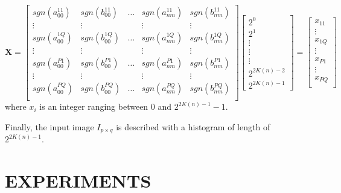 \documentclass[]{spie}  %
\begin{document}
\begin{equation}
\mathbf{X} = 
  \begin{bmatrix}
sgn(a_{00}^{11}) & sgn(b_{00}^{11}) & \hdots & sgn(a_{nm}^{11}) & sgn(b_{nm}^{11}) \\
  \vdots  & \vdots & & \vdots  & \vdots\\
sgn(a_{00}^{1Q}) & sgn(b_{00}^{1Q}) & \hdots & sgn(a_{nm}^{1Q}) & sgn(b_{nm}^{1Q}) \\
  \vdots  & \vdots & & \vdots  & \vdots\\
sgn(a_{00}^{P1}) & sgn(b_{00}^{P1}) & \hdots & sgn(a_{nm}^{P1}) & sgn(b_{nm}^{P1}) \\
  \vdots  & \vdots & & \vdots  & \vdots\\
sgn(a_{00}^{PQ}) &sgn(b_{00}^{PQ}) & \hdots & sgn(a_{nm}^{PQ}) & sgn(b_{nm}^{PQ}) \\
 \end{bmatrix}
 \begin{bmatrix}
2^0 \\
2^1 \\
 \vdots \\
  \vdots \\
   \vdots \\
 2^{2 K(n)-2} \\
 2^{2 K(n)-1}
 \end{bmatrix}=
 \begin{bmatrix}
 x_{11} \\
 \vdots \\
 x_{1Q} \\
  \vdots \\
 x_{P1} \\
  \vdots \\
 x_{PQ} \\
 \end{bmatrix}
 \label{eq:lzm_coded}
\end{equation}
where $x_{i}$ is an integer ranging between $0$ and $2^{2K(n)-1}-1$. 

Finally, the input image $I_{p\times q}$ is described with a histogram of length of $2^{2K(n)-1}$.



\section{EXPERIMENTS}
\end{document}
